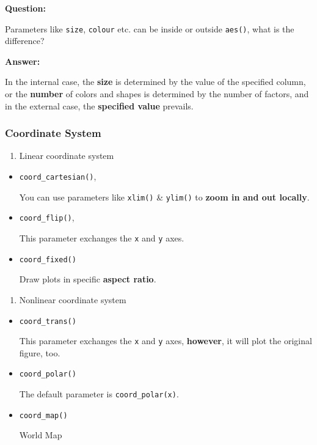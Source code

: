 \documentclass[
]{article}
\begin{document}
\textbf{Question:}

Parameters like \texttt{size}, \texttt{colour} etc. can be inside or
outside \texttt{aes()}, what is the difference?

\textbf{Answer:}

In the internal case, the \textbf{size} is determined by the value of
the specified column, or the \textbf{number} of colors and shapes is
determined by the number of factors, and in the external case, the
\textbf{specified value} prevails.

\hypertarget{coordinate-system}{%
\subsubsection{Coordinate System}\label{coordinate-system}}

\begin{enumerate}
\def\labelenumi{\arabic{enumi}.}
\item
  Linear coordinate system
\end{enumerate}

\begin{itemize}
\item
  \texttt{coord\_cartesian()},

  You can use parameters like \texttt{xlim()} \& \texttt{ylim()} to
  \textbf{zoom in and out locally}.
\item
  \texttt{coord\_flip()},

  This parameter exchanges the \texttt{x} and \texttt{y} axes.
\item
  \texttt{coord\_fixed()}

  Draw plots in specific \textbf{aspect ratio}.
\end{itemize}

\begin{enumerate}
\def\labelenumi{\arabic{enumi}.}
\item
  Nonlinear coordinate system
\end{enumerate}

\begin{itemize}
\item
  \texttt{coord\_trans()}

  This parameter exchanges the \texttt{x} and \texttt{y} axes,
  \textbf{however}, it will plot the original figure, too.
\item
  \texttt{coord\_polar()}

  The default parameter is \texttt{coord\_polar(x)}.
\item
  \texttt{coord\_map()}

  World Map
\end{itemize}
\end{document}
